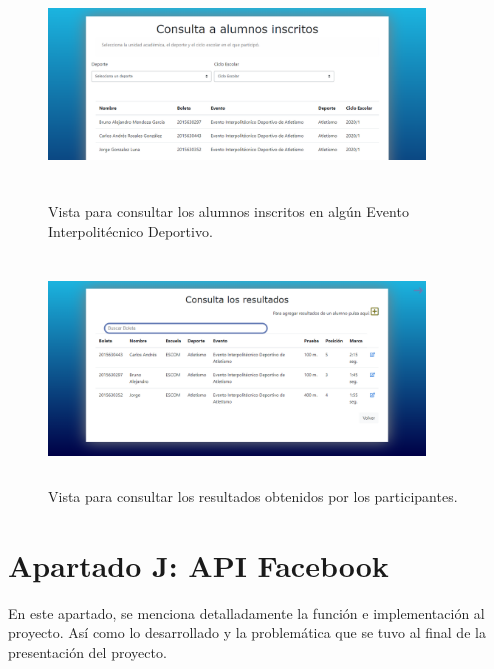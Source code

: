 		\begin{figure} [hbt!]
			\centering
			\includegraphics[width=10cm, height=6cm]{Imagenes/Vistas/Vista18_ConsultaInscritos}
			\caption{Vista para consultar los alumnos inscritos en algún Evento Interpolitécnico Deportivo.}
			\label{VistaConsultaInscritos}
		\end{figure}
		
		\begin{figure} [hbt!]
			\centering
			\includegraphics[width=10cm, height=6cm]{Imagenes/Vistas/Vista19_ConsultaResultados}
			\caption{Vista para consultar los resultados obtenidos por los participantes.}
			\label{VistaConsultaResultados}
		\end{figure}
				
		\chapter{Apartado J: API Facebook}
		\noindent En este apartado, se menciona detalladamente la función e implementación al proyecto. Así como lo desarrollado y la problemática que se tuvo al final de la presentación del proyecto.
		
		
